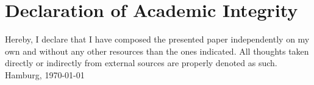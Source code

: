 \chapter*{Declaration of Academic Integrity}
Hereby, I declare that I have composed the presented paper independently on my own and without any other resources than the ones indicated. All thoughts taken directly or indirectly from external sources are properly denoted as such.
\\[2em]
Hamburg, \today
\\[8em]
\theauthor

\newpage